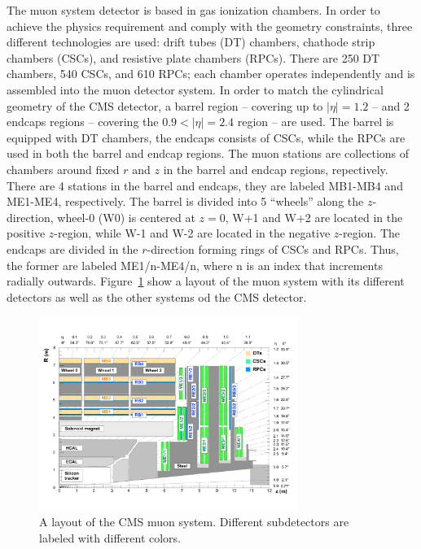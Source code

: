 The muon system detector is based in gas ionization chambers. In order
to achieve the physics requirement and comply with the geometry
constraints, three different technologies are used: drift tubes
(DT) chambers, chathode strip chambers (CSCs), and resistive plate chambers
(RPCs). There are 250 DT chambers, 540 CSCs, and 610 RPCs; each
chamber operates independently and is assembled into the muon detector
system. In order to match the cylindrical geometry of the CMS
detector, a barrel region -- covering up to $|\eta| = 1.2$ -- and 2
endcaps regions  -- covering the $ 0.9 < |\eta| = 2.4$ region --  are used. The barrel
is equipped with DT chambers, the endcaps consists of CSCs, while the
RPCs are used in both the barrel and endcap regions. The muon stations
are collections of chambers around fixed $r$ and $z$ in the barrel and
endcap regions, repectively. There are 4 stations in the barrel and
endcaps, they are labeled MB1-MB4 and ME1-ME4, respectively. The
barrel is divided into 5 ``wheels'' along the $z$-direction, wheel-0
(W0) is centered at $z=0$, W+1 and W+2 are located in the positive
$z$-region, while W-1 and W-2 are located in the negative
$z$-region. The endcaps are divided in the $r$-direction forming rings
of CSCs and RPCs. Thus, the former are labeled ME1/n-ME4/n, where n is
an index that increments radially
outwards. Figure~\ref{fig:MuonSystemLayout} show a layout of the
muon system with its different detectors as well as the other systems
od the CMS detector. 
\begin{figure}
 \centering
\includegraphics[width=0.75\textwidth]{CMS_DetectorFigures/MuonSystemLayout.pdf}
\caption{A layout of the CMS muon system. Different subdetectors are
  labeled with different colors.\label{fig:MuonSystemLayout}}
\end{figure}

